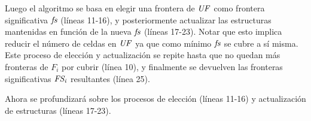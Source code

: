 Luego el algoritmo se basa en elegir una frontera de $\mathit{UF}$ como frontera
significativa $\mathit{fs}$ (líneas 11-16), y posteriormente actualizar las
estructuras mantenidas en función de la nueva $\mathit{fs}$ (líneas 17-23). Notar
que esto implica reducir el número de celdas en $\mathit{UF}$ ya que como mínimo
$\mathit{fs}$ se cubre a sí misma. Este proceso de elección y actualización se
repite hasta que no quedan más fronteras de $F_i$ por cubrir (línea 10),
y finalmente se devuelven las fronteras significativas $\mathit{FS_i}$ resultantes
(línea 25).
 
Ahora se profundizará sobre los procesos de elección (líneas 11-16) y
actualización de estructuras (líneas 17-23).


